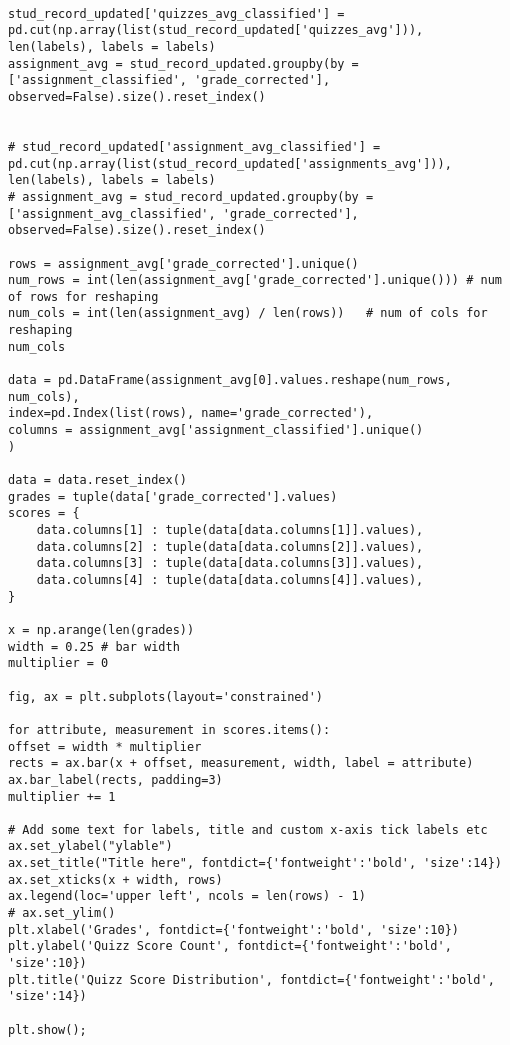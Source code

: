 \label{code:grade_quizz_score}
\begin{verbatim}
	
stud_record_updated['quizzes_avg_classified'] = pd.cut(np.array(list(stud_record_updated['quizzes_avg'])), len(labels), labels = labels)
assignment_avg = stud_record_updated.groupby(by = ['assignment_classified', 'grade_corrected'], observed=False).size().reset_index()


# stud_record_updated['assignment_avg_classified'] = pd.cut(np.array(list(stud_record_updated['assignments_avg'])), len(labels), labels = labels)
# assignment_avg = stud_record_updated.groupby(by = ['assignment_avg_classified', 'grade_corrected'], observed=False).size().reset_index()

rows = assignment_avg['grade_corrected'].unique()
num_rows = int(len(assignment_avg['grade_corrected'].unique())) # num of rows for reshaping
num_cols = int(len(assignment_avg) / len(rows))   # num of cols for reshaping
num_cols

data = pd.DataFrame(assignment_avg[0].values.reshape(num_rows, num_cols), 
index=pd.Index(list(rows), name='grade_corrected'),
columns = assignment_avg['assignment_classified'].unique()
)

data = data.reset_index()
grades = tuple(data['grade_corrected'].values)
scores = {
	data.columns[1] : tuple(data[data.columns[1]].values),
	data.columns[2] : tuple(data[data.columns[2]].values),
	data.columns[3] : tuple(data[data.columns[3]].values),
	data.columns[4] : tuple(data[data.columns[4]].values),
}

x = np.arange(len(grades))
width = 0.25 # bar width
multiplier = 0

fig, ax = plt.subplots(layout='constrained')

for attribute, measurement in scores.items():
offset = width * multiplier 
rects = ax.bar(x + offset, measurement, width, label = attribute)
ax.bar_label(rects, padding=3)
multiplier += 1

# Add some text for labels, title and custom x-axis tick labels etc
ax.set_ylabel("ylable")
ax.set_title("Title here", fontdict={'fontweight':'bold', 'size':14})
ax.set_xticks(x + width, rows)
ax.legend(loc='upper left', ncols = len(rows) - 1)
# ax.set_ylim()
plt.xlabel('Grades', fontdict={'fontweight':'bold', 'size':10})
plt.ylabel('Quizz Score Count', fontdict={'fontweight':'bold', 'size':10})
plt.title('Quizz Score Distribution', fontdict={'fontweight':'bold', 'size':14})

plt.show();
	
\end{verbatim}



